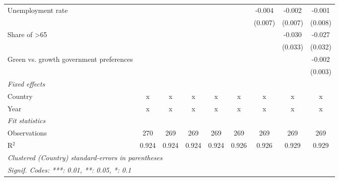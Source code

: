 \begin{table}[htbp]
\begin{tabular}{lcccccccc}
      Unemployment rate                                       &         &         &         &         &         & -0.004  & -0.002  & -0.001\\   
                                                              &         &         &         &         &         & (0.007) & (0.007) & (0.008)\\   
      Share of >65                                            &         &         &         &         &         &         & -0.030  & -0.027\\   
                                                              &         &         &         &         &         &         & (0.033) & (0.032)\\   
      Green vs. growth government preferences                 &         &         &         &         &         &         &         & -0.002\\   
                                                              &         &         &         &         &         &         &         & (0.003)\\   
      \emph{Fixed effects}\\
      Country                                                 & x       & x       & x       & x       & x       & x       & x       & x\\  
      Year                                                    & x       & x       & x       & x       & x       & x       & x       & x\\  
      \midrule \emph{Fit statistics}\\
      Observations                                            & 270     & 269     & 269     & 269     & 269     & 269     & 269     & 269\\  
      R$^2$                                                   & 0.924   & 0.924   & 0.924   & 0.924   & 0.926   & 0.926   & 0.929   & 0.929\\  
      \midrule
      \multicolumn{9}{l}{\emph{Clustered (Country) standard-errors in parentheses}}\\
      \multicolumn{9}{l}{\emph{Signif. Codes: ***: 0.01, **: 0.05, *: 0.1}}\\
   \end{tabular}
\end{table}


